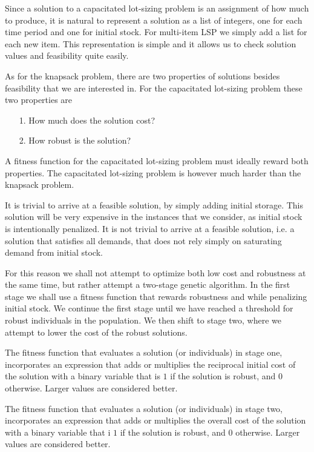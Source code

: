 Since a solution to a capacitated lot-sizing problem is an assignment of how much
to produce, it is natural to represent a solution as a list of
integers, one for each time period and one for initial stock. For
multi-item LSP we simply add a list for each new item. This
representation is simple and it allows us to check solution values and
feasibility quite easily.

As for the knapsack problem, there are two properties of solutions besides 
feasibility that we are interested in. For the capacitated lot-sizing problem
these two properties are

\begin{itemize}
\item[1.] How much does the solution cost?
\item[2.] How robust is the solution?
\end{itemize}

A fitness function for the capacitated lot-sizing problem must ideally
reward both properties. The capacitated lot-sizing problem is however
much harder than the knapsack problem.

It is trivial to arrive at a feasible solution, by simply adding
initial storage. This solution will be very expensive in the instances
that we consider, as initial stock is intentionally penalized. It is
not trivial to arrive at a feasible solution, i.e. a solution that
satisfies all demands, that does not rely simply on saturating demand
from initial stock.

For this reason we shall not attempt to optimize both low cost and
robustness at the same time, but rather attempt a two-stage genetic
algorithm. In the first stage we shall use a fitness function that
rewards robustness and while penalizing initial stock. We continue the
first stage until we have reached a threshold for robust individuals
in the population. We then shift to stage two, where we attempt to
lower the cost of the robust solutions.

The fitness function that evaluates a solution (or
individuals) in stage one, incorporates an expression that adds or multiplies the
reciprocal initial cost of the solution with a binary variable that is $1$ if
the solution is robust, and $0$ otherwise. Larger values are considered better.

The fitness function that evaluates a solution (or
individuals) in stage two, incorporates an expression that adds or multiplies the
overall cost of the solution with a binary variable that i $1$ if
the solution is robust, and $0$ otherwise. Larger values are considered better.

